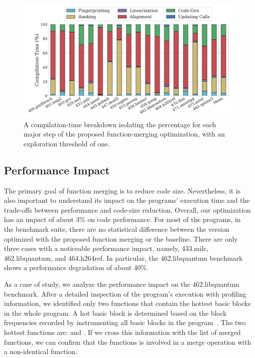 \begin{figure}[th]
  \hspace{-2ex}
  \includegraphics[width=1.05\linewidth]{figs/compilation-time-breakdown-sqrd.pdf}
  \caption{A compilation-time breakdown isolating the percentage for each major
           step of the proposed function-merging optimization,
           with an exploration threshold of one.}
  \label{fig:compilation-time-breakdown}
\end{figure}


\subsection{Performance Impact}


The primary goal of function merging is to reduce code size.
Nevertheless, it is also important to understand its impact on the programs'
execution time and the trade-offs between performance and code-size reduction.
Overall, our optimization has an impact of about 3\% on code performance.
For most of the programs, in the benchmark suite, there are no
statistical difference between the version optimized with the proposed function
merging or the baseline.
There are only three cases with a noticeable performance impact, namely,
433.milc, 462.libquantum, and 464.h264ref.
In particular, the 462.libquantum benchmark shows a performance degradation of
about 40\%.

As a case of study, we analyze the performance impact on the 462.libquantum
benchmark.
After a detailed inspection of the program's execution with profiling
information, we identified only two functions that contain the hottest basic
blocks in the whole program.
A hot basic block is determined based on the block frequencies recorded by
instrumenting all basic blocks in the program~\cite{ball94}.
The two hottest functions are:  and
.
If we cross this information with the list of merged functions, we can confirm
that the functions  is involved in a merge operation with
a non-identical function.

